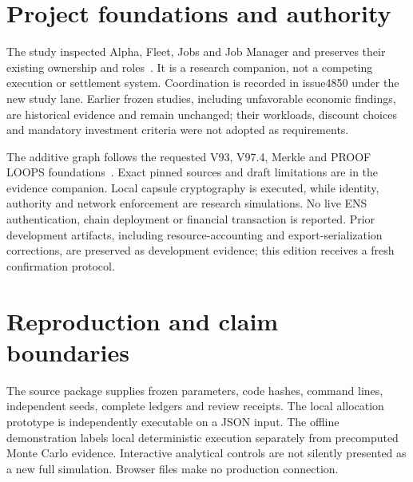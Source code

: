 \documentclass[11pt,letterpaper]{article}
\begin{document}



\section{Project foundations and authority}
The study inspected Alpha, Fleet, Jobs and Job Manager and preserves their existing ownership and roles~\cite{Alpha,Fleet,Jobs,Manager}. It is a research companion, not a competing execution or settlement system. Coordination is recorded in issue4850 under the new study lane. Earlier frozen studies, including unfavorable economic findings, are historical evidence and remain unchanged; their workloads, discount choices and mandatory investment criteria were not adopted as requirements.

The additive graph follows the requested V93, V97.4, Merkle and PROOF LOOPS foundations~\cite{V93,V974,Merkle,Proof}. Exact pinned sources and draft limitations are in the evidence companion. Local capsule cryptography is executed, while identity, authority and network enforcement are research simulations. No live ENS authentication, chain deployment or financial transaction is reported. Prior development artifacts, including resource-accounting and export-serialization corrections, are preserved as development evidence; this edition receives a fresh confirmation protocol.

\section{Reproduction and claim boundaries}
The source package supplies frozen parameters, code hashes, command lines, independent seeds, complete ledgers and review receipts. The local allocation prototype is independently executable on a JSON input. The offline demonstration labels local deterministic execution separately from precomputed Monte Carlo evidence. Interactive analytical controls are not silently presented as a new full simulation. Browser files make no production connection.


\clearpage
\small
\end{document}

